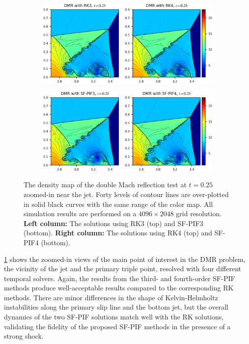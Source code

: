 \begin{figure}
    \centering
    \begin{subfigure}{\textwidth}
        \centering
        \includegraphics[width=\textwidth]{fig/dmr_weno5_rk_4096y2.png}
    \end{subfigure}
    \begin{subfigure}{\textwidth}
        \centering
        \includegraphics[width=\textwidth]{fig/dmr_weno5_sf_4096y2.png}
    \end{subfigure}
    \caption{The density map of the double Mach reflection test at \( t = 0.25 \)
        zoomed-in near the jet. Forty levels of contour lines are over-plotted
        in solid black curves with the same range of the color map.
        All simulation results are performed on a
        \( 4096 \times 2048 \) grid resolution.
        \textbf{Left column:} The solutions using RK3 (top) and SF-PIF3 (bottom).
        \textbf{Right column:} The solutions using  RK4 (top) and SF-PIF4 (bottom).
    }\label{fig:dmr}
\end{figure}

\cref{fig:dmr} shows the zoomed-in views of the main point of interest in the DMR problem,
the vicinity of the jet and the primary triple point, resolved with four different temporal solvers.
Again, the results from the third- and fourth-order SF-PIF methods
produce well-acceptable results compared to the corresponding RK methods.
There are minor differences in the shape of Kelvin-Helmholtz instabilities along the
primary slip line and the bottom jet,
but the overall dynamics of the two SF-PIF solutions match well with the RK solutions,
validating the fidelity of the proposed SF-PIF methods in the presence of a strong shock.



